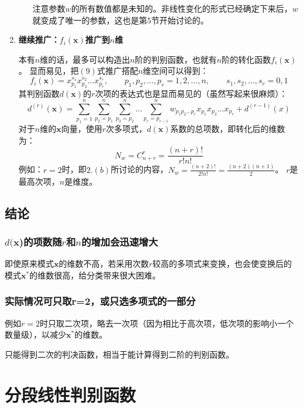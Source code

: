 \documentclass[12pt, letterpaper]{article}
\begin{document}
\begin{enumerate}
\begin{enumerate}
注意参数$w$的所有数值都是未知的。非线性变化的形式已经确定下来后，$w$就变成了唯一的参数，这也是第$5$节开始讨论的。
\end{enumerate}
\item \textbf{继续推广：$f_i(\mathbf{x})$推广到$n$维}

本有$n$维的话，最多可以构造出$n$阶的判别函数，也就有$n$阶的转化函数$f_i(\mathbf{x})$。
显而易见，把$(9)$式推广搭配$n$维空间可以得到：
\begin{equation}
f_i(\mathbf{x})=x_{p_1}^{s_1}x_{p_2}^{s_2}\ldots x_{p_r}^{s_r},\qquad p_1,p_2,\ldots,p_r=1,2,\ldots,n,\qquad s_1,s_2,\ldots,s_r=0,1
\end{equation}
其判别函数$d(\mathbf{x})$的$r$次项的表达式也是显而易见的（虽然写起来很麻烦）：
\begin{equation}
d^{(r)}(\mathbf{x})=\sum_{p_1=1}^n\sum_{p_2=p_1}^n\sum_{p_3=p_2}^n\ldots\sum_{p_r=p_{r-1}}^nw_{p_1p_2\ldots p_r}x_{p_1}x_{p_2}\ldots x_{p_r}+d^{(r-1)}(x)
\end{equation}
对于$n$维的$\mathbf{x}$向量，使用$r$次多项式，$d(\mathbf{x})$系数的总项数，即转化后的维数为：
\begin{equation}
N_w=C_{n+r}^r=\frac{(n+r)!}{r!n!}
\end{equation}
例如：$r=2$时，即$2.(b)$所讨论的内容，$N_w=\frac{(n+2)!}{2!n!}=\frac{(n+2)(n+1)}{2}$。
$r$是最高次项，$n$是维度。
\end{enumerate}
\subsection{结论}
\subsubsection*{$d(\mathbf{x}$)的项数随$r$和$n$的增加会迅速增大}
即使原来模式$\mathbf{x}$的维数不高，若采用次数$r$较高的多项式来变换，也会使变换后的模式$\mathbf{x^*}$的维数很高，给分类带来很大困难。
\subsubsection*{实际情况可只取r=2，或只选多项式的一部分}
例如$r=2$时只取二次项，略去一次项（因为相比于高次项，低次项的影响小一个数量级），以减少$\mathbf{x^*}$的维数。

只能得到二次的判决函数，相当于能计算得到二阶的判别函数。
\section{分段线性判别函数}
\end{document}
